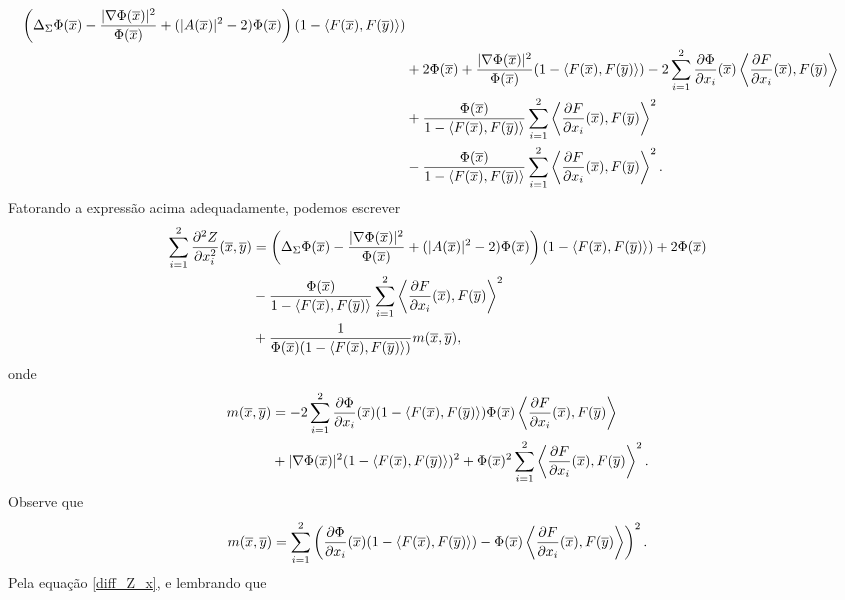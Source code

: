 \begin{demonstracao}
\begin{eqnarray*}
\begin{aligned}
\left(\Delta_{\Sigma} \Phi(\overline{x}) - \frac{|\nabla \Phi(\overline{x})|^2}{\Phi(\overline{x})} + (|A(\overline{x})|^2 - 2)\Phi(\overline{x})\right)(1 - \langle F(\overline{x}), F(\overline{y}) \rangle) \\
&+ 2 \Phi(\overline{x}) + \frac{|\nabla \Phi(\overline{x})|^2}{\Phi(\overline{x})} (1 - \langle F(\overline{x}), F(\overline{y}) \rangle) - 2 \sum_{i=1}^2 \frac{\partial \Phi}{\partial x_i}(\overline{x}) \left\langle \frac{\partial F}{\partial x_i}(\overline{x}), F(\overline{y}) \right\rangle \\
&+ \frac{\Phi(\overline{x})}{1 - \langle F(\overline{x}),F(\overline{y}) \rangle} \sum_{i=1}^2 \left\langle \frac{\partial F}{\partial x_i} (\overline{x}), F(\overline{y}) \right\rangle^2 \\
& - \frac{\Phi(\overline{x})}{1 - \langle F(\overline{x}),F(\overline{y}) \rangle} \sum_{i=1}^2
\left\langle \frac{\partial F}{\partial x_i} (\overline{x}), F(\overline{y}) \right\rangle^2.
\end{aligned}
\end{eqnarray*}
Fatorando a express\~ao acima adequadamente, podemos escrever
\begin{eqnarray*}
\begin{aligned}
\sum_{i=1}^2 \frac{\partial^2 Z}{\partial x_i^2}(\overline{x},\overline{y}) &= \left(\Delta_{\Sigma} \Phi(\overline{x}) - \frac{|\nabla \Phi(\overline{x})|^2}{\Phi(\overline{x})} + (|A(\overline{x})|^2 - 2)\Phi(\overline{x})\right)(1 - \langle F(\overline{x}), F(\overline{y}) \rangle)+ 2 \Phi(\overline{x})	\\
& - \frac{\Phi(\overline{x})}{1 - \langle F(\overline{x}),F(\overline{y}) \rangle} \sum_{i=1}^2 \left\langle \frac{\partial F}{\partial x_i} (\overline{x}), F(\overline{y}) \right\rangle^2 \\
& + \frac{1}{\Phi(\overline{x})(1 - \langle F(\overline{x}), F(\overline{y}) \rangle)}m(\overline{x},\overline{y}),
\end{aligned}
\end{eqnarray*}	
onde
\begin{eqnarray*}
\begin{aligned}
m(\overline{x},\overline{y}) &= - 2 \sum_{i=1}^2 \frac{\partial \Phi}{\partial x_i}(\overline{x}) 
(1 - \langle F(\overline{x}), F(\overline{y}) \rangle) \Phi(\overline{x}) \left\langle \frac{\partial F}
{\partial x_i}(\overline{x}), F(\overline{y}) \right\rangle \\
&+ |\nabla \Phi(\overline{x})|^2 (1 - \langle F(\overline{x}), F(\overline{y}) \rangle)^2 
 + \Phi(\overline{x})^2 \sum_{i=1}^2 \left\langle \frac{\partial F}
 {\partial x_i} (\overline{x}), F(\overline{y}) \right\rangle^2.
\end{aligned}
\end{eqnarray*}	
Observe que
\[
m(\overline{x},\overline{y}) = \sum_{i=1}^2 \left(  \frac{\partial \Phi}{\partial x_i}(\overline{x})
(1 - \langle F(\overline{x}),F(\overline{y}) \rangle) - \Phi(\overline{x}) \left\langle 
\frac{\partial F}{\partial x_i}(\overline{x}), F(\overline{y}) \right\rangle \right)^2.
\]
Pela equação \eqref{diff_Z_x}, e lembrando que 

\end{demonstracao}
